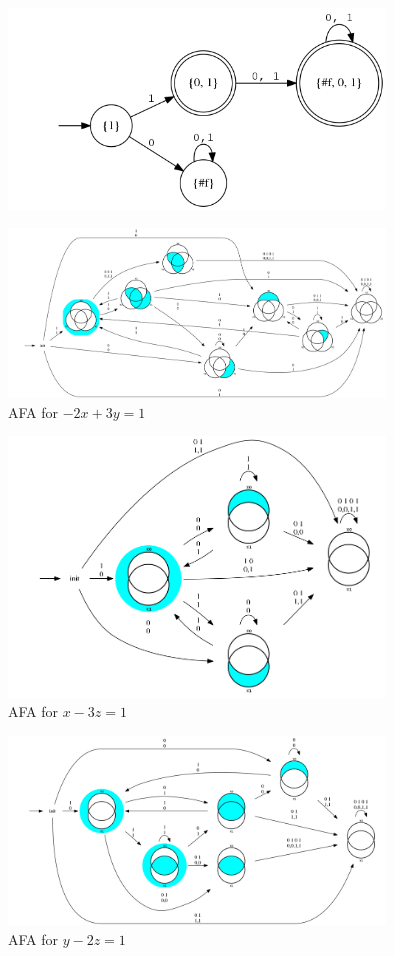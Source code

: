 \begin{example}
\begin{figure}
    \includegraphics[width=10cm]{images/proj_odd_x.png}
  \end{figure}
  \begin{figure}
    \caption{AFA for \( -2 x + 3y = 1 \)}
    \includegraphics[width=10cm]{images/afa_eq5.png}
  \end{figure}
  \begin{figure}
    \caption{AFA for \( x -3z = 1 \)}
    \includegraphics[width=10cm]{images/afa_mod3is1_x.png}
  \end{figure}
  \begin{figure}
    \caption{AFA for \( y -2z = 1 \)}
    \includegraphics[width=10cm]{images/afa_odd_x.png}
  \end{figure}
\end{example}

